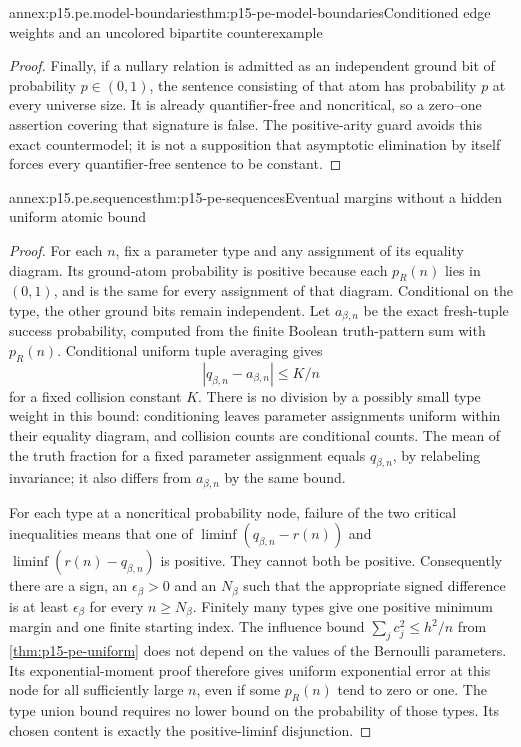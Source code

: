 \begin{annexitem}{annex:p15.pe.model-boundaries}{thm:p15-pe-model-boundaries}{Conditioned edge weights and an uncolored bipartite counterexample}
\begin{proof}
Finally, if a nullary relation is admitted as an independent ground
bit of probability \(p\in(0,1)\), the sentence consisting of that
atom has probability \(p\) at every universe size. It is already
quantifier-free and noncritical, so a zero--one assertion covering
that signature is false. The positive-arity guard avoids this exact
countermodel; it is not a supposition that asymptotic elimination
by itself forces every quantifier-free sentence to be constant.
\end{proof}
\end{annexitem}

\begin{annexitem}{annex:p15.pe.sequences}{thm:p15-pe-sequences}{Eventual margins without a hidden uniform atomic bound}
\begin{proof}
For each \(n\), fix a parameter type and any assignment of its equality
diagram. Its ground-atom probability is positive because each
\(p_R(n)\) lies in \((0,1)\), and is the same for every assignment of
that diagram. Conditional on the type, the other ground bits remain
independent. Let \(a_{\beta,n}\) be the exact fresh-tuple success
probability, computed from the finite Boolean truth-pattern sum with
\(p_R(n)\). Conditional uniform tuple averaging gives
\[
       |q_{\beta,n}-a_{\beta,n}|\le K/n
\]
for a fixed collision constant \(K\). There is no division by a
possibly small type weight in this bound: conditioning leaves parameter
assignments uniform within their equality diagram, and collision
counts are conditional counts. The mean of the truth fraction for a
fixed parameter assignment equals \(q_{\beta,n}\), by relabeling
invariance; it also differs from \(a_{\beta,n}\) by the same bound.

For each type at a noncritical probability node, failure of the two
critical inequalities means that one of
\(\liminf(q_{\beta,n}-r(n))\) and
\(\liminf(r(n)-q_{\beta,n})\) is positive. They cannot both be
positive. Consequently there are a sign, an \(\epsilon_\beta>0\)
and an \(N_\beta\) such that the appropriate signed difference is
at least \(\epsilon_\beta\) for every \(n\ge N_\beta\).
Finitely many types give one positive minimum margin and one finite
starting index. The influence bound
\(\sum_jc_j^2\le h^2/n\) from
\cref{thm:p15-pe-uniform} does not depend on the values of the
Bernoulli parameters. Its exponential-moment proof therefore gives
uniform exponential error at this node for all sufficiently large
\(n\), even if some \(p_R(n)\) tend to zero or one. The type union
bound requires no lower bound on the probability of those types.
Its chosen content is exactly the positive-liminf disjunction.


\end{proof}
\end{annexitem}
